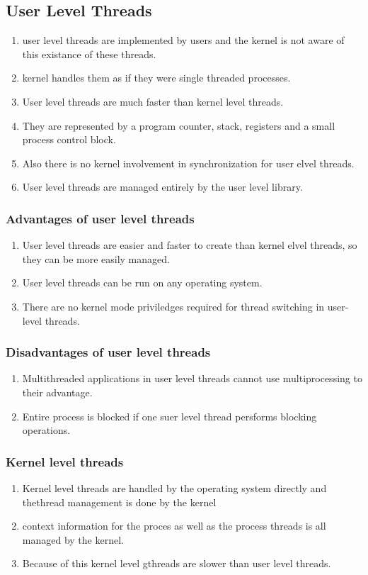 \documentclass[11pt]{article}
\begin{document}
\subsection{User Level Threads}
\begin{enumerate}
	\item user level threads are implemented by users and the kernel is not aware of this existance of these threads. 
	\item kernel handles them as if they were single threaded processes. 
	\item User level threads are much faster than kernel level threads. 
	\item They are represented by a program counter, stack, registers and a small process control block. 
	\item Also there is no kernel involvement in synchronization for user elvel threads. 
	\item User level threads are managed entirely by the user level library. 
\end{enumerate}

\subsubsection*{Advantages of user level threads}
\begin{enumerate}
	\item User level threads are easier and faster to create than kernel elvel threads, so they can be more easily managed. 
	\item User level threads can be run on any operating system. 
	\item There are no kernel mode priviledges required for thread switching in user-level threads. 
\end{enumerate}

\subsubsection*{Disadvantages of user level threads}
\begin{enumerate}
	\item Multithreaded applications in user level threads cannot use multiprocessing to their advantage. 
	\item Entire process is blocked if one suer level thread persforms blocking operations. 
\end{enumerate}

\subsubsection*{Kernel level threads}
\begin{enumerate}
	\item Kernel level threads are handled by the operating system directly and thethread management is done by the kernel  
	\item context information for the proces as well as the process threads is all managed by the kernel. 
	\item Because of this kernel level gthreads are slower than user level threads.
\end{enumerate}
\end{document}
